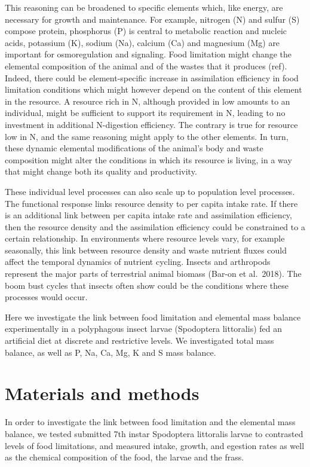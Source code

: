 \documentclass[
  12pt,
]{article}
\begin{document}
This reasoning can be broadened to specific elements which, like energy,
are necessary for growth and maintenance. For example, nitrogen (N) and
sulfur (S) compose protein, phosphorus (P) is central to metabolic
reaction and nucleic acids, potassium (K), sodium (Na), calcium (Ca) and
magnesium (Mg) are important for osmoregulation and signaling. Food
limitation might change the elemental composition of the animal and of
the wastes that it produces (ref). Indeed, there could be
element-specific increase in assimilation efficiency in food limitation
conditions which might however depend on the content of this element in
the resource. A resource rich in N, although provided in low amounts to
an individual, might be sufficient to support its requirement in N,
leading to no investment in additional N-digestion efficiency. The
contrary is true for resource low in N, and the same reasoning might
apply to the other elements. In turn, these dynamic elemental
modifications of the animal's body and waste composition might alter the
conditions in which its resource is living, in a way that might change
both its quality and productivity.

These individual level processes can also scale up to population level
processes. The functional response links resource density to per capita
intake rate. If there is an additional link between per capita intake
rate and assimilation efficiency, then the resource density and the
assimilation efficiency could be constrained to a certain relationship.
In environments where resource levels vary, for example seasonally, this
link between resource density and waste nutrient fluxes could affect the
temporal dynamics of nutrient cycling. Insects and arthropods represent
the major parts of terrestrial animal biomass (Bar-on et al.~2018). The
boom bust cycles that insects often show could be the conditions where
these processes would occur.

Here we investigate the link between food limitation and elemental mass
balance experimentally in a polyphagous insect larvae (Spodoptera
littoralis) fed an artificial diet at discrete and restrictive levels.
We investigated total mass balance, as well as P, Na, Ca, Mg, K and S
mass balance.

\section{Materials and methods}\label{materials-and-methods}

In order to investigate the link between food limitation and the
elemental mass balance, we tested submitted 7th instar Spodoptera
littoralis larvae to contrasted levels of food limitations, and measured
intake, growth, and egestion rates as well as the chemical composition
of the food, the larvae and the frass.
\end{document}
